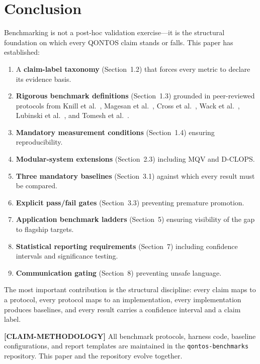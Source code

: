 \documentclass[conference]{IEEEtran}
\begin{document}
\section{Conclusion}

Benchmarking is not a post-hoc validation exercise---it is the structural foundation on which every QONTOS claim stands or falls. This paper has established:

\begin{enumerate}[leftmargin=*]
\item A \textbf{claim-label taxonomy} (Section~1.2) that forces every metric to declare its evidence basis.
\item \textbf{Rigorous benchmark definitions} (Section~1.3) grounded in peer-reviewed protocols from Knill et al.~\cite{knill2008}, Magesan et al.~\cite{magesan2012}, Cross et al.~\cite{cross2019}, Wack et al.~\cite{wack2021}, Lubinski et al.~\cite{lubinski2023}, and Tomesh et al.~\cite{tomesh2022}.
\item \textbf{Mandatory measurement conditions} (Section~1.4) ensuring reproducibility.
\item \textbf{Modular-system extensions} (Section~2.3) including MQV and D-CLOPS.
\item \textbf{Three mandatory baselines} (Section~3.1) against which every result must be compared.
\item \textbf{Explicit pass/fail gates} (Section~3.3) preventing premature promotion.
\item \textbf{Application benchmark ladders} (Section~5) ensuring visibility of the gap to flagship targets.
\item \textbf{Statistical reporting requirements} (Section~7) including confidence intervals and significance testing.
\item \textbf{Communication gating} (Section~8) preventing unsafe language.
\end{enumerate}

The most important contribution is the structural discipline: every claim maps to a protocol, every protocol maps to an implementation, every implementation produces baselines, and every result carries a confidence interval and a claim label.

\textbf{[CLAIM-METHODOLOGY]} All benchmark protocols, harness code, baseline configurations, and report templates are maintained in the \texttt{qontos-benchmarks} repository. This paper and the repository evolve together.
\end{document}
